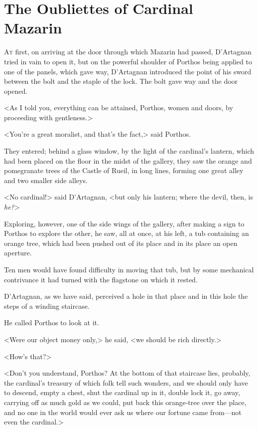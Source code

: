 \chapter{The Oubliettes of Cardinal Mazarin}

 \lettrine{A}{t} first, on arriving at the door through which Mazarin had passed, D'Artagnan tried in vain to open it, but on the powerful shoulder of Porthos being applied to one of the panels, which gave way, D'Artagnan introduced the point of his sword between the bolt and the staple of the lock. The bolt gave way and the door opened.

<As I told you, everything can be attained, Porthos, women and doors, by proceeding with gentleness.>

<You're a great moralist, and that's the fact,> said Porthos.

They entered; behind a glass window, by the light of the cardinal's lantern, which had been placed on the floor in the midst of the gallery, they saw the orange and pomegranate trees of the Castle of Rueil, in long lines, forming one great alley and two smaller side alleys.

<No cardinal!> said D'Artagnan, <but only his lantern; where the devil, then, is \textit{he?}>

Exploring, however, one of the side wings of the gallery, after making a sign to Porthos to explore the other, he saw, all at once, at his left, a tub containing an orange tree, which had been pushed out of its place and in its place an open aperture.

Ten men would have found difficulty in moving that tub, but by some mechanical contrivance it had turned with the flagstone on which it rested.

D'Artagnan, as we have said, perceived a hole in that place and in this hole the steps of a winding staircase.

He called Porthos to look at it.

<Were our object money only,> he said, <we should be rich directly.>

<How's that?>

<Don't you understand, Porthos? At the bottom of that staircase lies, probably, the cardinal's treasury of which folk tell such wonders, and we should only have to descend, empty a chest, shut the cardinal up in it, double lock it, go away, carrying off as much gold as we could, put back this orange-tree over the place, and no one in the world would ever ask us where our fortune came from—not even the cardinal.>


